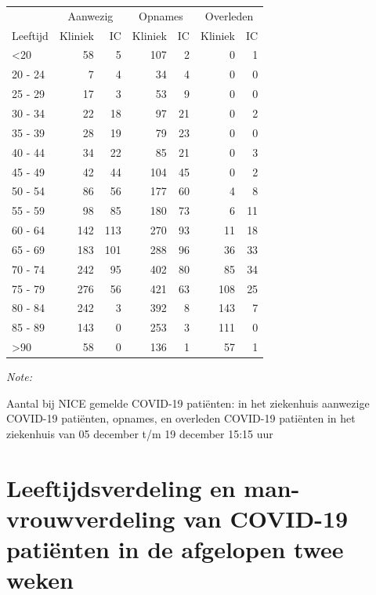 \documentclass[
  english,
  man,floatsintext]{apa6}
\begin{document}
\begin{table}
\centering\begingroup\fontsize{10}{12}\selectfont

\begin{threeparttable}
\begin{tabular}{lrrrrrr}
\toprule
\multicolumn{1}{c}{ } & \multicolumn{2}{c}{Aanwezig} & \multicolumn{2}{c}{Opnames} & \multicolumn{2}{c}{Overleden} \\
\cmidrule(l{3pt}r{3pt}){2-3} \cmidrule(l{3pt}r{3pt}){4-5} \cmidrule(l{3pt}r{3pt}){6-7}
Leeftijd & Kliniek & IC & Kliniek & IC & Kliniek & IC\\
\midrule
<20 & 58 & 5 & 107 & 2 & 0 & 1\\
20 - 24 & 7 & 4 & 34 & 4 & 0 & 0\\
25 - 29 & 17 & 3 & 53 & 9 & 0 & 0\\
30 - 34 & 22 & 18 & 97 & 21 & 0 & 2\\
35 - 39 & 28 & 19 & 79 & 23 & 0 & 0\\
40 - 44 & 34 & 22 & 85 & 21 & 0 & 3\\
45 - 49 & 42 & 44 & 104 & 45 & 0 & 2\\
50 - 54 & 86 & 56 & 177 & 60 & 4 & 8\\
55 - 59 & 98 & 85 & 180 & 73 & 6 & 11\\
60 - 64 & 142 & 113 & 270 & 93 & 11 & 18\\
65 - 69 & 183 & 101 & 288 & 96 & 36 & 33\\
70 - 74 & 242 & 95 & 402 & 80 & 85 & 34\\
75 - 79 & 276 & 56 & 421 & 63 & 108 & 25\\
80 - 84 & 242 & 3 & 392 & 8 & 143 & 7\\
85 - 89 & 143 & 0 & 253 & 3 & 111 & 0\\
>90 & 58 & 0 & 136 & 1 & 57 & 1\\
\bottomrule
\end{tabular}
\begin{tablenotes}
\item \textit{Note: } 
\item Aantal bij NICE gemelde COVID-19 patiënten: in het ziekenhuis aanwezige COVID-19 patiënten, opnames, en overleden COVID-19 patiënten in het ziekenhuis van 05 december t/m 19 december 15:15 uur
\end{tablenotes}
\end{threeparttable}
\endgroup{}
\end{table}

\newpage

\hypertarget{leeftijdsverdeling-en-man-vrouwverdeling-van-covid-19-patiuxebnten-in-de-afgelopen-twee-weken}{%
\section{Leeftijdsverdeling en man-vrouwverdeling van COVID-19 patiënten in de afgelopen twee weken}\label{leeftijdsverdeling-en-man-vrouwverdeling-van-covid-19-patiuxebnten-in-de-afgelopen-twee-weken}}
\end{document}
